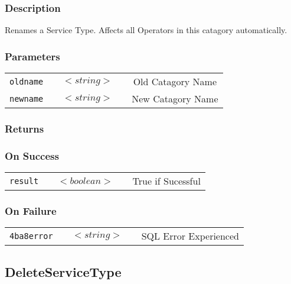 \subsubsection{Description}

Renames a Service Type. Affects all Operators in this catagory
automatically. 

\subsubsection{Parameters}

\begin{tabular}{ccccc}
\verb!oldname! & \vspace{15mm} & $<string>$ & \vspace{15mm} & Old Catagory Name \\
\verb!newname! & \vspace{15mm} & $<string>$ & \vspace{15mm} & New Catagory Name \\
\end{tabular}

\subsubsection{Returns}

\subsubsection{On Success}

\begin{tabular}{ccccc}
\verb!result! & \vspace{15mm} & $<boolean>$ & \vspace{15mm} & True if Sucessful \\
\end{tabular}

\subsubsection{On Failure}

\begin{tabular}{ccccc}
\verb!4ba8error! & \vspace{15mm} & $<string>$ & \vspace{15mm} & SQL Error Experienced \\
\end{tabular}


\subsection{DeleteServiceType}

